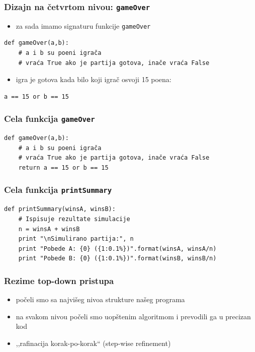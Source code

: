 \documentclass[utf8,compress]{beamer}
\begin{document}
\begin{frame}[fragile]
  \frametitle{Dizajn na četvrtom nivou: \texttt{gameOver}}
\begin{itemize}
  \item za sada imamo signaturu funkcije \texttt{gameOver}
\end{itemize}
\begin{verbatim}
def gameOver(a,b):
    # a i b su poeni igrača
    # vraća True ako je partija gotova, inače vraća False
\end{verbatim}
\begin{itemize}
  \item igra je gotova kada bilo koji igrač osvoji 15 poena:
\end{itemize}
\begin{verbatim}
a == 15 or b == 15
\end{verbatim}
\end{frame}

\begin{frame}[fragile]
  \frametitle{Cela funkcija \texttt{gameOver}}
\begin{verbatim}
def gameOver(a,b):
    # a i b su poeni igrača
    # vraća True ako je partija gotova, inače vraća False
    return a == 15 or b == 15
\end{verbatim}
\end{frame}

\begin{frame}[fragile,shrink=10]
  \frametitle{Cela funkcija \texttt{printSummary}}
\begin{verbatim}
def printSummary(winsA, winsB):
    # Ispisuje rezultate simulacije
    n = winsA + winsB
    print "\nSimulirano partija:", n
    print "Pobede A: {0} ({1:0.1%})".format(winsA, winsA/n)
    print "Pobede B: {0} ({1:0.1%})".format(winsB, winsB/n)
\end{verbatim}
\end{frame}

\begin{frame}
  \frametitle{Rezime top-down pristupa}
\begin{itemize}
  \item počeli smo sa najvišeg nivoa strukture našeg programa
  \item na svakom nivou počeli smo uopštenim algoritmom i prevodili ga u precizan kod
  \item ,,rafinacija korak-po-korak`` (step-wise refinement)
\end{itemize}
\end{frame}
\end{document}
